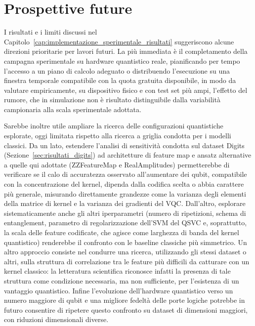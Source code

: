 \section*{Prospettive future}

I risultati e i limiti discussi nel Capitolo~\ref{cap:implementazione_sperimentale_risultati} suggeriscono alcune direzioni prioritarie per lavori futuri. La più immediata è il completamento della campagna sperimentale su hardware quantistico reale, pianificando per tempo l'accesso a un piano di calcolo adeguato o distribuendo l'esecuzione su una finestra temporale compatibile con la quota gratuita disponibile, in modo da valutare empiricamente, su dispositivo fisico e con test set più ampi, l'effetto del rumore, che in simulazione non è risultato distinguibile dalla variabilità campionaria alla scala sperimentale adottata.

Sarebbe inoltre utile ampliare la ricerca delle configurazioni quantistiche esplorate, oggi limitata rispetto alla ricerca a griglia condotta per i modelli classici. Da un lato, estendere l'analisi di sensitività condotta sul dataset Digits (Sezione~\ref{sec:risultati_digits}) ad architetture di feature map e ansatz alternative a quelle qui adottate (ZZFeatureMap e RealAmplitudes) permetterebbe di verificare se il calo di accuratezza osservato all'aumentare dei qubit, compatibile con la concentrazione del kernel, dipenda dalla codifica scelta o abbia carattere più generale, misurando direttamente grandezze come la varianza degli elementi della matrice di kernel e la varianza dei gradienti del VQC. Dall'altro, esplorare sistematicamente anche gli altri iperparametri (numero di ripetizioni, schema di entanglement, parametro di regolarizzazione dell'SVM del QSVC e, soprattutto, la scala delle feature codificate, che agisce come larghezza di banda del kernel quantistico) renderebbe il confronto con le baseline classiche più simmetrico.
Un altro approccio consiste nel condurre una ricerca, utilizzando gli stessi dataset o altri, sulla struttura di correlazione tra le feature più difficili da catturare con un kernel classico: la letteratura scientifica riconosce infatti la presenza di tale struttura come condizione necessaria, ma non sufficiente, per l'esistenza di un vantaggio quantistico.
Infine l'evoluzione dell'hardware quantistico verso un numero maggiore di qubit e una migliore fedeltà delle porte logiche potrebbe in futuro consentire di ripetere questo confronto su dataset di dimensioni maggiori, con riduzioni dimensionali diverse.
